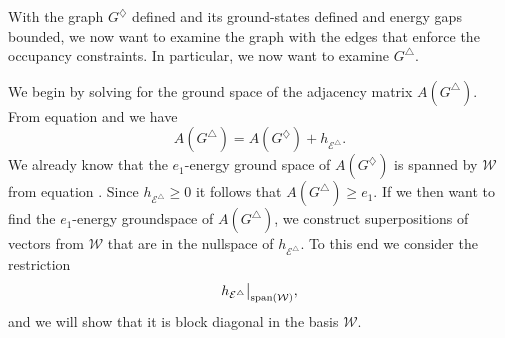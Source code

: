 \documentclass[../thesis-main/thesis-main]{subfiles}
\begin{document}
With the graph $G^{\diamondsuit}$ defined and its ground-states defined and energy gaps bounded, we now want to examine the graph with the edges that enforce the occupancy constraints.  In particular, we now want to examine $G^{\triangle}$.

We begin by solving for the ground space of the adjacency matrix $A(G^{\triangle})$. From equation  and  we have
\begin{equation}
  A(G^{\triangle})=A(G^{\diamondsuit})+h_{\mathcal{E}^{\triangle}}.\label{eq:A_g_diamond_triangle}
\end{equation}
We already know that the  $e_{1}$-energy ground space of $A(G^{\diamondsuit})$ is spanned by $\mathcal{W}$ from equation . Since $h_{\mathcal{E}^{\triangle}}\geq0$ it follows that $A(G^{\triangle})\geq e_{1}$.  If we then want to find the $e_{1}$-energy groundspace of $A(G^{\triangle})$, we construct superpositions of vectors from $\mathcal{W}$ that are in the nullspace of $h_{\mathcal{E}^{\triangle}}$. To this end we consider the restriction
\begin{equation}
  h_{\mathcal{E}^{\triangle}}\big|_{\operatorname{span}\left(\mathcal{W}\right)},\label{eq:restriction_h_triangle}
\end{equation}
and we will show that it is block diagonal in the basis $\mathcal{W}$.
\end{document}
